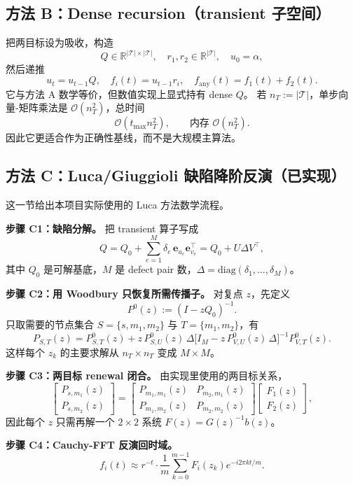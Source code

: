 \documentclass[11pt,a4paper]{ctexart}
\begin{document}
\subsection{方法 B：Dense recursion（transient 子空间）}
把两目标设为吸收，构造
\[
Q\in\mathbb{R}^{|\mathcal T|\times |\mathcal T|},\quad r_1,r_2\in\mathbb{R}^{|\mathcal T|},\quad u_0=\alpha,
\]
然后递推
\[
u_t=u_{t-1}Q,\quad f_i(t)=u_{t-1}r_i,\quad f_{\mathrm{any}}(t)=f_1(t)+f_2(t).
\]
它与方法 A 数学等价，但数值实现上显式持有 dense $Q$。
若 $n_T:=|\mathcal T|$，单步向量-矩阵乘法是 $\mathcal O(n_T^2)$，总时间
\[
\mathcal O(t_{\max}n_T^2),\qquad \text{内存 } \mathcal O(n_T^2).
\]
因此它更适合作为正确性基线，而不是大规模主算法。

\subsection{方法 C：Luca/Giuggioli 缺陷降阶反演（已实现）}
这一节给出本项目实际使用的 Luca 方法数学流程。

\textbf{步骤 C1：缺陷分解。}
把 transient 算子写成
\[
Q=Q_0+\sum_{e=1}^{M}\delta_e\,\mathbf e_{u_e}\mathbf e_{v_e}^{\top}
=Q_0+U\Delta V^\top,
\]
其中 $Q_0$ 是可解基底，$M$ 是 defect pair 数，$\Delta=\mathrm{diag}(\delta_1,\dots,\delta_M)$。

\textbf{步骤 C2：用 Woodbury 只恢复所需传播子。}
对复点 $z$，先定义
\[
P^0(z):=(I-zQ_0)^{-1}.
\]
只取需要的节点集合 $S=\{s,m_1,m_2\}$ 与 $T=\{m_1,m_2\}$，有
\[
P_{S,T}(z)
=P^0_{S,T}(z)
+z\,P^0_{S,U}(z)\,\Delta
\bigl[I_M-z\,P^0_{V,U}(z)\,\Delta\bigr]^{-1}
P^0_{V,T}(z).
\]
这样每个 $z_k$ 的主要求解从 $n_T\times n_T$ 变成 $M\times M$。

\textbf{步骤 C3：两目标 renewal 闭合。}
由实现里使用的两目标关系，
\[
\begin{bmatrix}
P_{s,m_1}(z)\\
P_{s,m_2}(z)
\end{bmatrix}
=
\begin{bmatrix}
P_{m_1,m_1}(z) & P_{m_2,m_1}(z)\\
P_{m_1,m_2}(z) & P_{m_2,m_2}(z)
\end{bmatrix}
\begin{bmatrix}
F_1(z)\\
F_2(z)
\end{bmatrix},
\]
因此每个 $z$ 只需再解一个 $2\times2$ 系统 $F(z)=G(z)^{-1}b(z)$。

\textbf{步骤 C4：Cauchy-FFT 反演回时域。}
\[
 f_i(t)\approx r^{-t}\cdot\frac{1}{m}\sum_{k=0}^{m-1}F_i(z_k)e^{-i2\pi kt/m}.
\]
\end{document}

